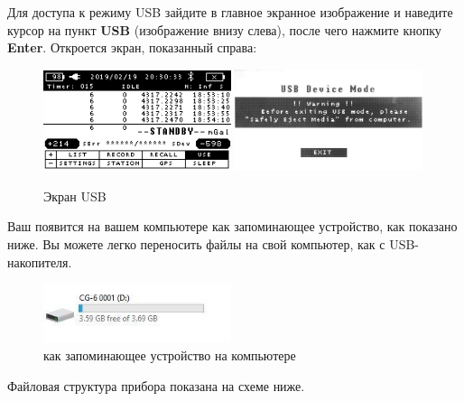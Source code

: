 Для доступа к режиму USB зайдите в главное экранное изображение и наведите
курсор на пункт \textbf{USB} (изображение внизу слева), после чего нажмите
кнопку \textbf{Enter}.  Откроется экран, показанный справа:

\begin{figure}[h]
  \centering
  \includegraphics[width=0.49\textwidth]{figures/the_usb_screen_1}
  \includegraphics[width=0.49\textwidth]{figures/the_usb_screen_2}
  \caption{Экран USB}
  \label{fig:the_usb_screen}
\end{figure}


Ваш \cg{} появится на вашем компьютере как запоминающее устройство, как показано
ниже. Вы можете легко переносить файлы на свой компьютер, как с USB-накопителя.

\begin{figure}[h]
  \centering
  \includegraphics[width=0.49\textwidth]{figures/the_cg6_autograv_as_a_mass_storage_device_on_your_computer}
  \caption{\cg{} как запоминающее устройство на компьютере}
  \label{fig:the_cg6_autograv_as_a_mass_storage_device_on_your_computer}
\end{figure}

Файловая структура прибора \cg{} показана на схеме ниже.


